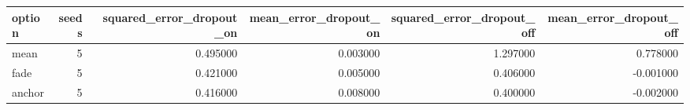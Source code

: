 \begin{tabular}{lrrrrr}
\toprule
option & seeds & squared_error_dropout_on & mean_error_dropout_on & squared_error_dropout_off & mean_error_dropout_off \\
\midrule
mean & 5 & 0.495000 & 0.003000 & 1.297000 & 0.778000 \\
fade & 5 & 0.421000 & 0.005000 & 0.406000 & -0.001000 \\
anchor & 5 & 0.416000 & 0.008000 & 0.400000 & -0.002000 \\
\bottomrule
\end{tabular}
